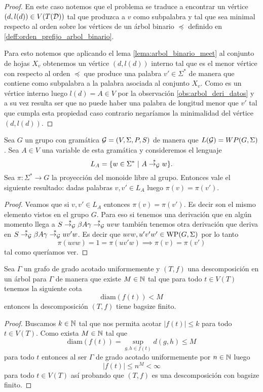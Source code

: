 \documentclass[tesis.tex]{subfiles}
\begin{document}
\begin{leoenv}
\begin{proof}
		En este caso notemos que el problema se traduce a encontrar un vértice $(d,l(d)) \in V(T({\cal D}))$ tal que produzca a $v$ como subpalabra y tal que sea minimal respecto al orden sobre los vértices de un árbol binario $\preceq$ definido en \ref{deff:orden_prefijo_arbol_binario}.

		Para esto notemos que aplicando el lema \ref{lema:arbol_binario_meet} al conjunto de hojas $X_{v}$ obtenemos un vértice $(d,l(d))$ interno tal que es el menor vértice con respecto al orden $\preceq$ que produce una palabra $v' \in \Sigma^{*}$ de manera que contiene como subpalabra a la palabra asociada al conjunto $X_{v}$.
		Como es un vértice interno luego $l(d) = A \in V$ por la observación \ref{obs:arbol_deri_datos} y a su vez resulta ser que no puede haber una palabra de longitud menor que $v'$ tal que cumpla esta propiedad caso contrario negaríamos la minimalidad del vértice $(d,l(d))$.
	\end{proof}
\end{leoenv}


\begin{lema}\label{palabras-wp}
	Sea $G$ un grupo \ic con gramática ${\cal G} = (V, \Sigma, P, S)$ de manera que $L({\cal G}) = WP(G,\Sigma)$.
	Sea $A \in V$ una variable de esta gramática y consideremos el lenguaje
	\[
	L_A = \{ w \in \Sigma^*  \ | \ A \overset{*}{\to_{\cal G}} w  \}.
	\]
	Sea $\pi:\Sigma^* \to G$ la proyección del monoide libre al grupo.
	Entonces vale el siguiente resultado:
	dadas palabras $v,v' \in L_{A}$ luego $\pi(v) = \pi(v')$.
\end{lema}

\begin{proof}
	Veamos que si $v,v' \in L_A$ entonces $\pi(v){=} \pi(v')$. 
	Es decir son el mismo elemento vistos en el grupo $G$. 
	Para eso si tenemos una derivación que en algún momento llega a $S \overset{*}{\to_{\cal G}} \beta A \gamma \overset{*}{\to_{\cal G}} uvw$ también tenemos otra derivación que deriva en $S \overset{*}{\to_{\cal G}} \beta A \gamma  \overset{*}{\to_{\cal G}} uv'w$. 
	Es decir que $uvw, u'v'w' \in \text{WP}(G, \Sigma)$ por lo tanto 
	\begin{equation*}
		\pi(uvw) = 1 = \pi(uv'w) \implies \pi(v) = \pi( v')
	\end{equation*}
	tal como queríamos ver.
\end{proof}

\begin{lema}\label{lema_tw_diam_bagsize}
	Sea $\Gamma$ un grafo de grado acotado uniformemente y 
	$(T,f)$ una descomposición en un árbol para $\Gamma$ de manera que existe $M \in \mathbb{N}$ tal que para todo $t \in V(T)$ tenemos la siguiente cota
	\[
		\text{diam}( f(t)) < M
	\]   
	entonces la descomposición $(T,f)$ tiene bagsize finito.
\end{lema}
\begin{proof}
	Buscamos $k \in \mathbb{N}$ tal que nos permita acotar $|f(t)| \le k$ para todo $t \in V(T)$. 
	Como exista $M \in \mathbb{N}$ tal que 
	\[
	\text{diam}(f(t)) =  \sup_{g,h \in f(t)} d(g,h) \le M
	\] 
	para todo $t$ 
	entonces al ser $\Gamma$ de grado acotado uniformemente por $n \in \mathbb{N}$ luego 
	\[
		|f(t)| \le n^{M} < \infty
	\]
	para todo $t \in V(T)$ así probando que $(T,f)$ es una descomposición con bagsize finito.
\end{proof}
\end{document}
